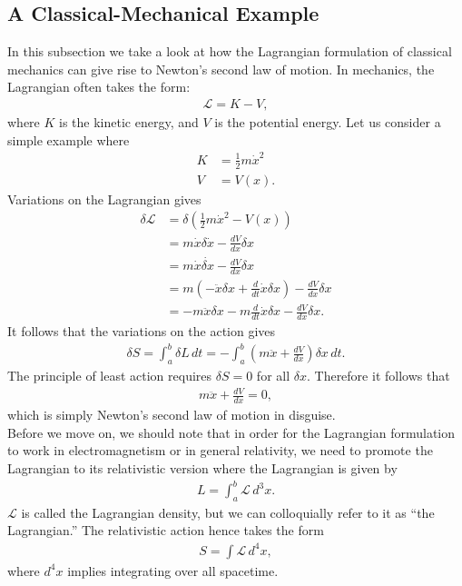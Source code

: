 \documentclass[a4paper,11pt]{article}
\numberwithin{equation}{section}
\theoremstyle{definition}
\begin{document}
\subsection{A Classical-Mechanical Example}
In this subsection we take a look at how the Lagrangian formulation of classical mechanics can give rise to Newton's second law of motion. In mechanics, the Lagrangian often takes the form:
\begin{align}
\mathcal{L} = K - V,
\end{align}
where $K$ is the kinetic energy, and $V$ is the potential energy. Let us consider a simple example where
\begin{align*}
K &= \frac{1}{2}m\dot{x}^2\\
V &= V(x).
\end{align*}
Variations on the Lagrangian gives
\begin{align*}
\delta \mathcal{L} &= \delta\left( \frac{1}{2}m\dot{x}^2 - V(x) \right)\\
&= m\dot{x}\delta \dot{x} - \frac{dV}{dx}\delta x\\
&= m\dot{x}\dot{\delta x} - \frac{dV}{dx}\delta x\\
&= m \left( -\ddot{x}\delta x + \frac{d}{dt}\dot{x}\delta x \right) - \frac{dV}{dx}\delta x\\
&= -m\ddot{x}\delta x - m\frac{d}{dt}\dot{x}\delta x - \frac{dV}{dx}\delta x. 
\end{align*}
It follows that the variations on the action gives
\begin{align*}
\delta S = \int_{a}^{b}\delta L \,dt = -\int_a^b\left( m\ddot{x} + \frac{dV}{dx} \right)\delta x\,dt.
\end{align*}
The principle of least action requires $\delta S = 0$ for all $\delta x$. Therefore it follows that
\begin{align*}
m\ddot{x} + \frac{dV}{dx} = 0,
\end{align*}
which is simply Newton's second law of motion in disguise. \\

Before we move on, we should note that in order for the Lagrangian formulation to work in electromagnetism or in general relativity, we need to promote the Lagrangian to its relativistic version where the Lagrangian is given by
\begin{align*}
L = \int_a^b\mathcal{L}\,d^3x.
\end{align*}
$\mathcal{L}$ is called the Lagrangian density, but we can colloquially refer to it as ``the Lagrangian.'' The relativistic action hence takes the form
\begin{align*}
S = \int \mathcal{L}\,d^4x,
\end{align*}
where $d^4x$ implies integrating over all spacetime.
\end{document}
